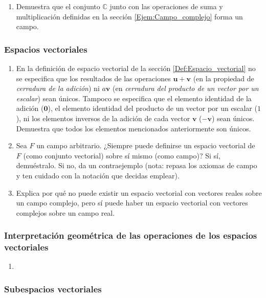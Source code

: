 \documentclass[12pt]{article}
\begin{document}
\begin{enumerate}
    \item Demuestra que el conjunto $\mathbb{C}$ junto con las operaciones de suma y multiplicación definidas en la sección \ref{Ejem:Campo_complejo} forma un campo.
\end{enumerate}{}

\subsubsection{Espacios vectoriales} \label{Ejer:Espacios_vectoriales}

\begin{enumerate}
    \item En la definición de espacio vectorial de la sección \ref{Def:Espacio_vectorial} no se especifica que los resultados de las operaciones $\mathbf{u}+\mathbf{v}$ (en la propiedad de \textit{cerradura de la adición}) ni $a\mathbf{v}$ (en \textit{cerradura del producto de un vector por un escalar}) sean únicos. Tampoco se especifica que el elemento identidad de la adición ($\mathbf{0}$), el elemento identidad del producto de un vector por un escalar ($1$), ni los elementos inversos de la adición de cada vector $\mathbf{v}$ ($-\mathbf{v}$) sean únicos. Demuestra que todos los elementos mencionados anteriormente son únicos. 
    \item Sea $F$ un campo arbitrario. ¿Siempre puede definirse un espacio vectorial de $F$ (como conjunto vectorial) sobre sí mismo (como campo)? Si sí, demuéstralo. Si no, da un contraejemplo (nota: repasa los axiomas de campo y ten cuidado con la notación que decidas emplear).
    \item Explica por qué no puede existir un espacio vectorial con vectores reales sobre un campo complejo, pero sí puede haber un espacio vectorial con vectores complejos sobre un campo real.
\end{enumerate}{}

\subsubsection{Interpretación geométrica de las operaciones de los espacios vectoriales}

\begin{enumerate}
    \item 
\end{enumerate}{}

\subsubsection{Subespacios vectoriales}
\end{document}
